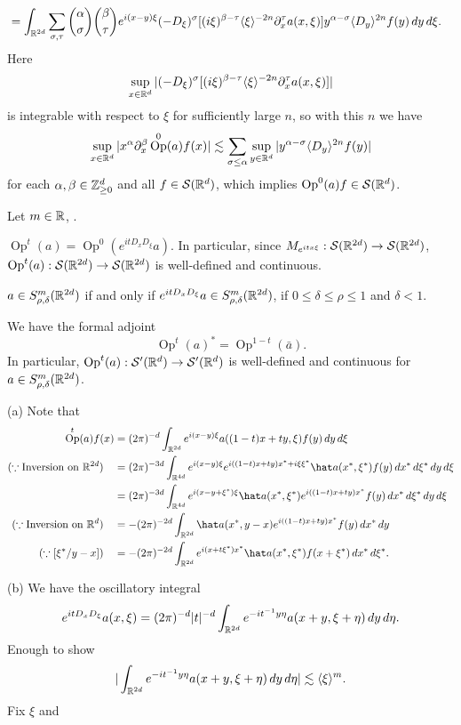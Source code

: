 \documentclass{../../large}
\DeclareMathOperator{\Op}{Op}
\begin{document}
\begin{pf}
\begin{align*}
&=\int_{\mathbb{R}^{2d}}\sum_{\sigma,\tau}{\alpha\choose\sigma}{\beta\choose\tau}e^{i(x-y)\xi}(-D_\xi)^{\sigma}[(i\xi)^{\beta-\tau}\langle\xi\rangle^{-2n}\partial_x^\tau a(x,\xi)]y^{\alpha-\sigma}\langle D_y\rangle^{2n}f(y)\,dy\,d\xi.
\end{align*}
Here
\[\sup_{x\in\mathbb{R}^d}|(-D_\xi)^{\sigma}[(i\xi)^{\beta-\tau}\langle\xi\rangle^{-2n}\partial_x^\tau a(x,\xi)]|\]
is integrable with respect to $\xi$ for sufficiently large $n$, so with this $n$ we have
\[\sup_{x\in\R^d}|x^\alpha\partial_x^\beta\Op^0(a)f(x)|\lesssim\sum_{\sigma\le\alpha}\sup_{y\in\R^d}|y^{\alpha-\sigma}\<D_y\>^{2n}f(y)|\]
for each $\alpha,\beta\in\mathbb{Z}_{\ge0}^d$ and all $f\in\mathcal{S}(\mathbb{R}^d)$, which implies $\Op^0(a)f\in\cS(\R^d)$.
\end{pf}

\begin{prb}
Let $m\in\mathbb{R}$, .
\begin{parts}
\item $\Op^t(a)=\Op^0(e^{itD_xD_\xi}a)$.
In particular, since $M_{e^{itx\xi}}:\mathcal{S}(\mathbb{R}^{2d})\to\mathcal{S}(\mathbb{R}^{2d})$, $\Op^t(a):\cS(\R^{2d})\to\cS(\R^{2d})$ is well-defined and continuous.
\item $a\in S_{\rho,\delta}^m(\mathbb{R}^{2d})$ if and only if $e^{itD_xD_\xi}a\in S_{\rho,\delta}^m(\mathbb{R}^{2d})$, if $0\le\delta\le\rho\le1$ and $\delta<1$.
\item We have the formal adjoint
\[\Op^t(a)^*=\Op^{1-t}(\bar a).\]
In particular, $\Op^t(a):\cS'(\R^d)\to\cS'(\R^d)$ is well-defined and continuous for $a\in S_{\rho,\delta}^m(\mathbb{R}^{2d})$.
\end{parts}
\end{prb}

\begin{pf}
(a)
Note that
\begin{align*}
\Op^t(a)f(x)
&=(2\pi)^{-d}\int_{\R^{2d}}e^{i(x-y)\xi}a((1-t)x+ty,\xi)f(y)\,dy\,d\xi\\
(\because\text{Inversion on }\R^{2d})\quad
&=(2\pi)^{-3d}\int_{\R^{4d}}e^{i(x-y)\xi}e^{i((1-t)x+ty)x^*+i\xi\xi^*}\hat a(x^*,\xi^*)f(y)\,dx^*\,d\xi^*\,dy\,d\xi\\
&=(2\pi)^{-3d}\int_{\R^{4d}}e^{i(x-y+\xi^*)\xi}\hat a(x^*,\xi^*)e^{i((1-t)x+ty)x^*}f(y)\,dx^*\,d\xi^*\,dy\,d\xi\\
(\because\text{Inversion on }\R^d)\quad
&=-(2\pi)^{-2d}\int_{\R^{2d}}\hat a(x^*,y-x)e^{i((1-t)x+ty)x^*}f(y)\,dx^*\,dy\\
(\because[\xi^*/y-x])\quad
&=-(2\pi)^{-2d}\int_{\R^{2d}}e^{i(x+t\xi^*)x^*}\hat a(x^*,\xi^*)f(x+\xi^*)\,dx^*\,d\xi^*.
\end{align*}

(b)
We have the oscillatory integral
\[e^{itD_xD_\xi}a(x,\xi)=(2\pi)^{-d}|t|^{-d}\int_{\mathbb{R}^{2d}}e^{-it^{-1}y\eta}a(x+y,\xi+\eta)\,dy\,d\eta.\]
Enough to show
\[|\int_{\mathbb{R}^{2d}}e^{-it^{-1}y\eta}a(x+y,\xi+\eta)\,dy\,d\eta|\lesssim\langle\xi\rangle^m.\]
Fix $\xi$ and
\delta\le\rho
\end{pf}
\end{document}
